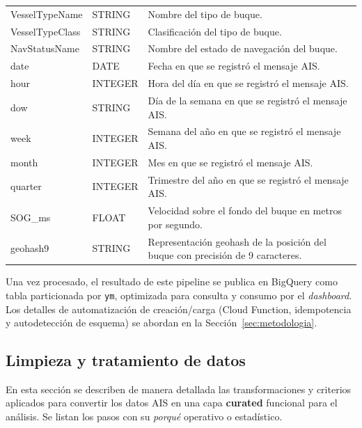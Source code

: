 \documentclass[10pt]{article}
\begin{document}
\begin{table}[H]
\begin{tabular}{@{}llp{8cm}@{}}
  VesselTypeName & STRING & Nombre del tipo de buque. \\
  VesselTypeClass & STRING & Clasificación del tipo de buque. \\
  NavStatusName & STRING & Nombre del estado de navegación del buque. \\
  date & DATE & Fecha en que se registró el mensaje AIS. \\
  hour & INTEGER & Hora del día en que se registró el mensaje AIS. \\
  dow & STRING & Día de la semana en que se registró el mensaje AIS. \\
  week & INTEGER & Semana del año en que se registró el mensaje AIS. \\
  month & INTEGER & Mes en que se registró el mensaje AIS. \\
  quarter & INTEGER & Trimestre del año en que se registró el mensaje AIS. \\
  SOG\_ms & FLOAT & Velocidad sobre el fondo del buque en metros por segundo. \\
  geohash9 & STRING & Representación geohash de la posición del buque con precisión de 9 caracteres. \\
  \bottomrule
  \end{tabular}
\end{table}

Una vez procesado, el resultado de este pipeline se publica en BigQuery como tabla particionada por \texttt{ym}, optimizada para consulta y consumo por el \textit{dashboard}. Los detalles de automatización de creación/carga (Cloud Function, idempotencia y autodetección de esquema) se abordan en la Sección~\ref{sec:metodologia}.
\subsection{Limpieza y tratamiento de datos} 
\label{sec:cleaning}

En esta sección se describen de manera detallada las transformaciones y criterios aplicados para convertir los datos AIS en una capa \textbf{curated} funcional para el análisis. Se listan los pasos con su \emph{porqué} operativo o estadístico.
\end{document}

